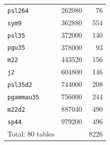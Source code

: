\begin{longtable}{lrr}
\texttt{psl264} & 262080 & 76\\
\texttt{sym9} & 362880 & 554\\
\texttt{psl35} & 372000 & 140\\
\texttt{pgu35} & 378000 & 93\\
\texttt{m22} & 443520 & 156\\
\texttt{j2} & 604800 & 146\\
\texttt{psl35d2} & 744000 & 208\\
\texttt{pgammau35} & 756000 & 244\\
\texttt{m22d2} & 887040 & 490\\
\texttt{sp44} & 979200 & 496\\
\midrule Total: 80 tables &&8226\\\bottomrule
\end{longtable}

